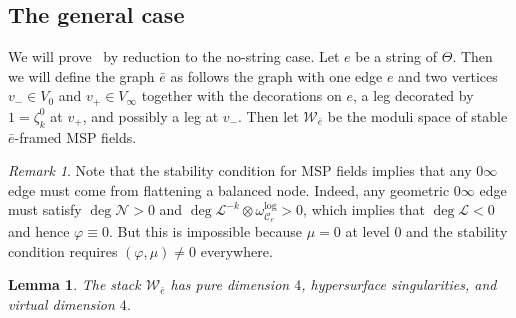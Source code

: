 \documentclass{amsart}
\newtheorem{lem}[thm]{Lemma}
\theoremstyle{definition}
\theoremstyle{remark}
\newtheorem{rmk}[thm]{Remark}
\theoremstyle{plain}
\theoremstyle{definition}
\theoremstyle{remark}
\newcommand{\mc}[1]{\mathcal{#1}}
\newcommand{\1}{\mathbf{1}}
\newcommand{\2}{\mathbf{2}}
\newcommand{\3}{\mathbf{3}}
\begin{document}
\subsection{The general case}%
\label{sub:general irrvan}

We will prove~ by reduction to the no-string case. Let $e$ be a string of $\Theta$. Then we will define the graph $\bar{e}$ as follows the graph with one edge $e$ and two vertices $v_- \in V_0$ and $v_+ \in V_{\infty}$ together with the decorations on $e$, a leg decorated by $1 = \zeta_k^0$ at $v_+$, and possibly a leg at $v_-$. Then let $\mc{W}_{\bar{e}}$ be the moduli space of stable $\bar{e}$-framed MSP fields.

\begin{rmk}
    Note that the stability condition for MSP fields implies that any $0\infty$ edge must come from flattening a balanced node. Indeed, any geometric $0\infty$ edge must satisfy $\deg \mc{N} > 0$ and $\deg \mc{L}^{-k} \otimes \omega_{\mc{C}_e}^{\log} > 0$, which implies that $\deg \mc{L} < 0$ and hence $\varphi \equiv 0$. But this is impossible because $\mu = 0$ at level $0$ and the stability condition requires $(\varphi, \mu) \neq 0$ everywhere.
\end{rmk}

\begin{lem}
    The stack $\mc{W}_{\bar{e}}$ has pure dimension $4$, hypersurface singularities, and virtual dimension $4$.
\end{lem}
\end{document}
